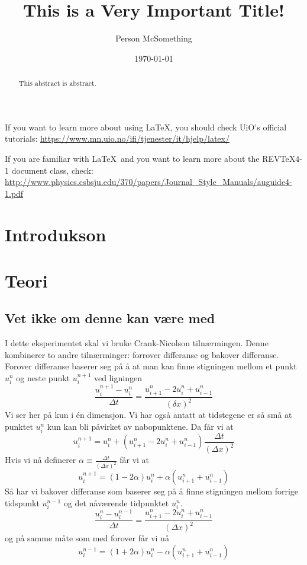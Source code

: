 \documentclass[reprint,english,notitlepage]{revtex4-2}  %
\begin{document}
\title{This is a Very Important Title!}   %
\author{Person McSomething}               %
\date{\today}                             %
\noaffiliation                            %
\begin{abstract}                          %
This abstract is abstract.                %
\end{abstract}                            %
\maketitle                                %

If you want to learn more about using \LaTeX, you should check UiO's official tutorials:
\url{https://www.mn.uio.no/ifi/tjenester/it/hjelp/latex/}

If you are familiar with \LaTeX\ and you want to learn more about the REVTeX4-1 document class, check:
\url{http://www.physics.csbsju.edu/370/papers/Journal_Style_Manuals/auguide4-1.pdf}


\section{Introdukson}

\section{Teori}   %

\subsection{Vet ikke om denne kan være med}
I dette eksperimentet skal vi bruke Crank-Nicolson tilnærmingen. Denne kombinerer to andre tilnærminger: forrover differanse og bakover differanse.
Forover differanse baserer seg på å at man kan finne stigningen mellom et punkt $u^{n}_i$ og neste punkt $u^{n+1}_{i}$ ved ligningen
$$
\frac{u^{n+1}_{i}-u^n_i}{\Delta t}=\frac{u^n_{i+1}-2u^n_i+u^n_{i-1}}{(\delta x)^2}
$$
Vi ser her på kun i én dimensjon. Vi har også antatt at tidstegene er så små at punktet $u^n_i$ kun kan bli påvirket av nabopunktene. Da får vi at
$$
u^{n+1}_i=u^n_i+(u^n_{i+1}-2u^n_i+u^n_{i-1})\frac{\Delta t}{(\Delta x)^2}
$$
Hvis vi nå definerer $\alpha\equiv \frac{\Delta t}{(\Delta x)^2}$
får vi at
$$
u^{n+1}_i=(1-2\alpha)u^n_i+\alpha(u^n_{i+1}+u^n_{i-1})
$$
Så har vi bakover differanse som baserer seg på å finne stigningen mellom forrige tidspunkt $u^{n-1}_i$ og det nåværende tidpunktet $u^n_i$. 
$$
\frac{u^n_i-u^{n-1}_i}{\Delta t}=\frac{u^n_{i+1}-2u^n_i+u^{n}_{i-1}}{(\Delta x)^2}
$$
og på samme måte som med forover får vi nå
$$
u^{n-1}_i=(1+2\alpha)u^n_i-\alpha(u^n_{i+1}+u^n_{i-1})
$$
\end{document}
